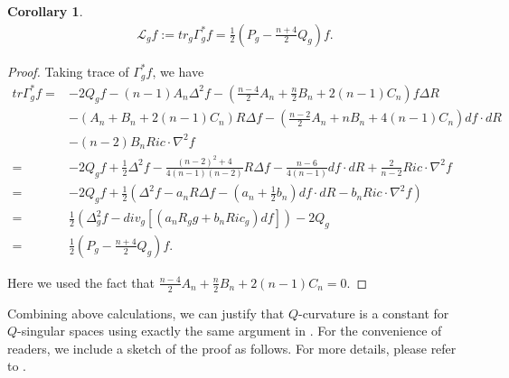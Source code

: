 \documentclass[12pt]{amsart}
\newtheorem{corollary}[theorem]{Corollary}
\theoremstyle{definition}
\theoremstyle{remark}
\numberwithin{equation}{section}
\begin{document}
\begin{corollary}
\begin{align*}
\mathscr{L}_g f := tr_g \Gamma_g^* f = \frac{1}{2} \left( P_g - \frac{n + 4}{2} Q_g \right) f. 
\end{align*}
\end{corollary}

\begin{proof}
Taking trace of $\Gamma_g^* f$, we have
\begin{align*}
tr \Gamma_g^* f =& -2 Q_g f - (n-1) A_n \Delta^2 f - \left( \frac{n-4}{2} A_n + \frac{n}{2}B_n + 2(n-1)C_n \right)f \Delta R \\
&- (A_n + B_n + 2(n-1)C_n) R \Delta f - \left( \frac{n-2}{2}A_n + n B_n + 4(n-1) C_n\right) df \cdot dR \\
&- (n-2) B_n Ric \cdot \nabla^2 f\\
=&  -2 Q_g f + \frac{1}{2} \Delta^2 f - \frac{(n-2)^2 + 4}{4(n-1)(n-2)} R \Delta f - \frac{n-6}{4(n-1)} df \cdot dR + \frac{2}{n-2} Ric \cdot \nabla^2 f\\
=&  -2 Q_g f + \frac{1}{2} \left( \Delta^2 f - a_n R \Delta f - \left(a_n + \frac{1}{2}b_n\right) df \cdot dR - b_n Ric \cdot \nabla^2 f \right)\\
=& \frac{1}{2} \left( \Delta_g^2 f- div_g \left[(a_n R_g g + b_n Ric_g) df \right] \right) - 2 Q_g \\
= &\frac{1}{2} \left( P_g - \frac{n+4}{2} Q_g \right) f. 
\end{align*}

Here we used the fact that $\frac{n-4}{2} A_n + \frac{n}{2}B_n + 2(n-1)C_n =0$.
\end{proof}

Combining above calculations, we can justify that $Q$-curvature is a constant for $Q$-singular spaces using exactly the same argument in \cite{C-G-Y}. For the convenience of readers, we include a sketch of the proof as follows. For more details, please refer to \cite{C-G-Y}.
\end{document}
